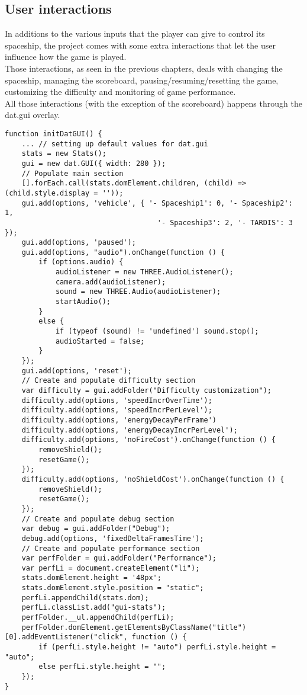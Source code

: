 \documentclass[a4paper,11pt]{article}
\begin{document}
\subsection{User interactions}
In additions to the various inputs that the player can give to control its spaceship, the project comes with some extra interactions that let the user influence how the game is played.\\
Those interactions, as seen in the previous chapters, deals with changing the spaceship, managing the scoreboard, pausing/resuming/resetting the game, customizing the difficulty and monitoring of game performance.\\
All those interactions (with the exception of the scoreboard) happens through the dat.gui overlay.\\
\begin{verbatim}
function initDatGUI() {
    ... // setting up default values for dat.gui
    stats = new Stats();
    gui = new dat.GUI({ width: 280 });
    // Populate main section
    [].forEach.call(stats.domElement.children, (child) => (child.style.display = ''));
    gui.add(options, 'vehicle', { '- Spaceship1': 0, '- Spaceship2': 1,
                                    '- Spaceship3': 2, '- TARDIS': 3 });
    gui.add(options, 'paused');
    gui.add(options, "audio").onChange(function () {
        if (options.audio) {
            audioListener = new THREE.AudioListener();
            camera.add(audioListener);
            sound = new THREE.Audio(audioListener);
            startAudio();
        }
        else {
            if (typeof (sound) != 'undefined') sound.stop();
            audioStarted = false;
        }
    });
    gui.add(options, 'reset');
    // Create and populate difficulty section
    var difficulty = gui.addFolder("Difficulty customization");
    difficulty.add(options, 'speedIncrOverTime');
    difficulty.add(options, 'speedIncrPerLevel');
    difficulty.add(options, 'energyDecayPerFrame')
    difficulty.add(options, 'energyDecayIncrPerLevel');
    difficulty.add(options, 'noFireCost').onChange(function () {
        removeShield();
        resetGame();
    });
    difficulty.add(options, 'noShieldCost').onChange(function () {
        removeShield();
        resetGame();
    });
    // Create and populate debug section
    var debug = gui.addFolder("Debug");
    debug.add(options, 'fixedDeltaFramesTime');
    // Create and populate performance section
    var perfFolder = gui.addFolder("Performance");
    var perfLi = document.createElement("li");
    stats.domElement.height = '48px';
    stats.domElement.style.position = "static";
    perfLi.appendChild(stats.dom);
    perfLi.classList.add("gui-stats");
    perfFolder.__ul.appendChild(perfLi);
    perfFolder.domElement.getElementsByClassName("title")[0].addEventListener("click", function () {
        if (perfLi.style.height != "auto") perfLi.style.height = "auto";
        else perfLi.style.height = "";
    });
}
\end{verbatim}
\end{document}
